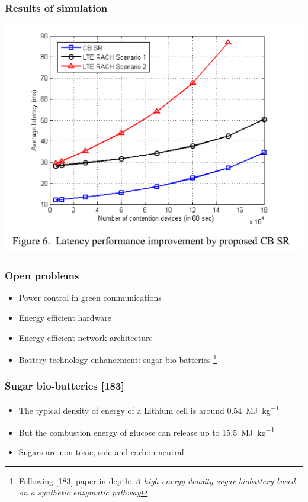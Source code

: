 \documentclass[a4paper,12pt,handout]{beamer}
\begin{document}
\begin{frame}
	\frametitle{Results of simulation}

	\begin{center}
	\includegraphics[scale=0.4]{cb-latency.png}
	\end{center}

\end{frame}
\note{}
\begin{frame}
\frametitle{Open problems}

\begin{itemize}
\item Power control in green communications
\item Energy efficient hardware
\item Energy efficient network architecture
\item Battery technology enhancement: sugar bio-batteries %
\footnote{Following [183] paper in depth: \textsl{A high-energy-density sugar 
biobattery based on a synthetic enzymatic pathway}}
\end{itemize}

\end{frame}
\note{}
\begin{frame}
\frametitle{Sugar bio-batteries [183]}

\begin{itemize}

	\item The typical density of energy of a Lithium cell is around 
	\SI{0.54}{\mega\joule\per\kilogram}

	\item But the combustion energy of glucose can release up to 
	\SI{15.5}{\mega\joule\per\kilogram}

	\item Sugars are non toxic, safe and carbon neutral

\end{itemize}
\end{frame}
\note{}
\end{document}
